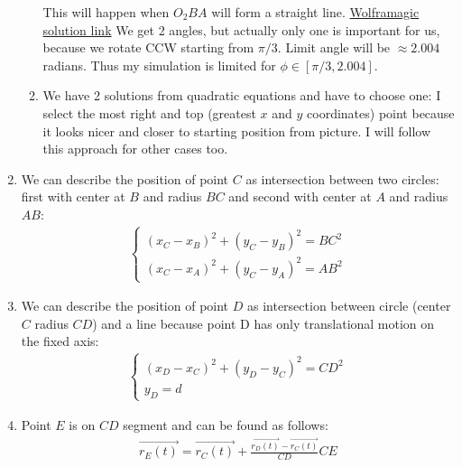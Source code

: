 \begin{enumerate}
\begin{enumerate}
                    This will happen when $O_2BA$ will form a straight line.
                    \href{https://www.wolframalpha.com/input?i=%2821+*+cos%28x%29+-+56%29%5E2+%2B+%2821+*+sin%28x%29+%2B+26%29%5E2+%3D+%2854+%2B+25%29%5E2}{Wolframagic solution link}
                    We get 2 angles, but actually only one is important for us, because we rotate CCW starting from $\pi/3$.
                    Limit angle will be $\approx 2.004$ radians. Thus my simulation is limited for $\phi \in [\pi/3, 2.004]$.
              \item We have 2 solutions from quadratic equations and have to choose one:
                    I select the most right and top (greatest $x$ and $y$ coordinates) point because it looks nicer and closer to starting position from picture.
                    I will follow this approach for other cases too.
          \end{enumerate}

    \item We can describe the position of point $C$ as intersection between two circles: first with center at $B$ and radius $BC$ and second with center at $A$ and radius $AB$:
          \begin{align}
              \begin{cases}
                  (x_C - x_B)^2 + (y_C - y_B)^2 = BC^2 \\
                  (x_C - x_A)^2 + (y_C - y_A)^2 = AB^2
              \end{cases}
          \end{align}

    \item We can describe the position of point $D$ as intersection between circle (center $C$ radius $CD$) and a line because point D has only translational motion on the fixed axis:
          \begin{align}
              \begin{cases}
                  (x_D - x_C)^2 + (y_D - y_C)^2 = CD^2 \\
                  y_D = d
              \end{cases}
          \end{align}

    \item Point $E$ is on $CD$ segment and can be found as follows:
          \begin{align}
              \vec{r_E(t)} = \vec{r_C(t)} + \frac{\vec{r_D(t)} - \vec{r_C(t)}}{CD} CE
          \end{align}


\end{enumerate}
